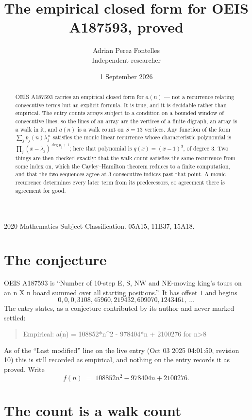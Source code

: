 \documentclass[11pt,a4paper]{article}
\title{The empirical closed form for OEIS A187593, proved}
\author{Adrian Perez Fontelles\\ \small Independent researcher}
\date{1 September 2026}
\theoremstyle{plain}
\theoremstyle{definition}
\begin{document}
\maketitle

\begin{abstract}
OEIS A187593 carries an empirical closed form for $a(n)$ --- not a recurrence relating
consecutive terms but an explicit formula. It is true, and it is decidable rather than
empirical. The entry counts arrays subject to a condition on a bounded window of consecutive lines, so the lines of an array are the
vertices of a finite digraph, an array is a walk in it, and $a(n)$ is a walk count on
$S=13$ vertices. Any function of the form $\sum_j p_j(n)\lambda_j^{\,n}$ satisfies the
monic linear recurrence whose characteristic polynomial is
$\prod_j(x-\lambda_j)^{\deg p_j+1}$; here that polynomial is $q(x)=(x-1)^{3}$, of degree
$3$. Two things are then checked exactly: that the walk count satisfies the same
recurrence from some index on, which the Cayley--Hamilton theorem reduces to a finite
computation, and that the two sequences agree at $3$ consecutive indices past that
point. A monic recurrence determines every later term from its predecessors, so agreement
there is agreement for good.
\end{abstract}

\noindent\small 2020 Mathematics Subject Classification. 05A15, 11B37, 15A18.\normalsize

\section{The conjecture}

OEIS A187593 is ``Number of 10-step E, S, NW and NE-moving king's tours on an n X n board summed over all starting positions.''. It has offset $1$ and begins
\[
0, 0, 0, 3108, 45960, 219432, 609070, 1243461,\ \dots
\]
The entry states, as a conjecture contributed by its author and never marked settled:
\begin{quote}
Empirical: a(n) = 108852*n\^{}2 - 978404*n + 2100276 for n>8
\end{quote}
As of the ``Last modified'' line on the live entry (Oct 03 2025 04:01:50, revision 10) this is still
recorded as empirical, and nothing on the entry records it as proved. Write
\[
f(n)\;=\;108852 n^{2} - 978404 n + 2100276.
\]

\section{The count is a walk count}
\end{document}

